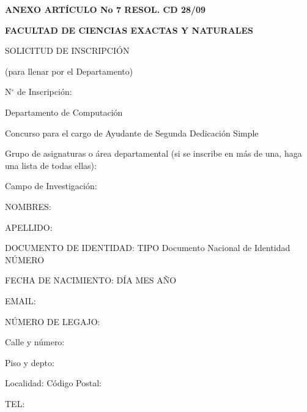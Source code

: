 \documentclass{article}
\newcommand{\cargo}[1]{\noindent Concurso para el cargo de {#1} \hspace{0.5cm} Dedicación Simple}
\newcommand{\areas}[3]{\noindent Grupo de asignaturas o área departamental (si se inscribe en más de una, haga una lista de todas ellas):

\medskip

\noindent {#1}\ifthenelse{\equal{#2}{}}{}{, {#2}}\ifthenelse{\equal{#3}{}}{}{, {#3}}
}
\newcommand{\apellido}[1]{\noindent APELLIDO: {#1}}
\newcommand{\nombre}[1]{\noindent NOMBRES: {#1}}
\newcommand{\dni}[1]{\noindent DOCUMENTO DE IDENTIDAD: TIPO Documento Nacional de Identidad \hspace{0.25cm} NÚMERO {#1}}
\newcommand{\fechaNacimiento}[3]{\noindent FECHA DE NACIMIENTO: DÍA {#1} \hspace{0.1cm} MES {#2} {\hspace{0.1cm}} AÑO {#3}}
\newcommand{\domicilio}[5]{\noindent Calle y número: {#1}

\noindent Piso y depto: {#2}

\noindent Localidad: {#3} {\hspace{3cm}} Código Postal: {#4}

\noindent TEL: {#5}
}
\newcommand{\email}[1]{\noindent EMAIL: {#1}}
\newcommand{\legajo}[1]{\noindent NÚMERO DE LEGAJO: {#1}}
\begin{document}
\begin{center}
{\bf ANEXO ARTÍCULO No 7 RESOL. CD 28/09}
\end{center}
{\bf \noindent FACULTAD DE CIENCIAS EXACTAS Y NATURALES

\noindent SOLICITUD DE INSCRIPCIÓN}

\bigskip

\noindent (para llenar por el Departamento) 

\bigskip

\noindent N$^\circ$ de Inscripción: \hdashrule{4cm}{0.5pt}{0.75pt}

\medskip

\noindent Departamento de Computación

\cargo{Ayudante de Segunda}

\areas{\primerAreaQueConcursa}{\segundaAreaQueConcursa}{\tercerAreaQueConcursa}

\medskip

\noindent \hdashrule{\linewidth}{0.5pt}{0.75pt}

\noindent Campo de Investigación:

\medskip

\noindent \hdashrule{\linewidth}{0.5pt}{0.75pt}

\medskip

\noindent \hdashrule{\linewidth}{0.5pt}{0.75pt}

\medskip

\noindent \hrulefill

\bigskip

\nombre{\nombresDelAspirante}

\medskip

\apellido{\apellidoDelAspirante}

\medskip

\dni{\numeroDocumentoDeIdentidadDelAspirante}

\medskip

\fechaNacimiento{\numeroDiaNacimientoDelAspirante}{\numeroMesNacimientoDelAspirante}{\anioNacimientoDelAspirante}

\medskip

\email{\emailDelAspirante}

\medskip

\legajo{\numeroDeLegajoDelAspirante}

\bigskip

\domicilio{\direccionDelDomicilioDelAspirante}{\pisoDelDomicilioDelAspirante}{\localidadDelDomicilioDelAspirante}{\codigoPostalDelDomicilioDelAspirante}{\telefonoDelDomicilioDelAspirante}
\end{document}
